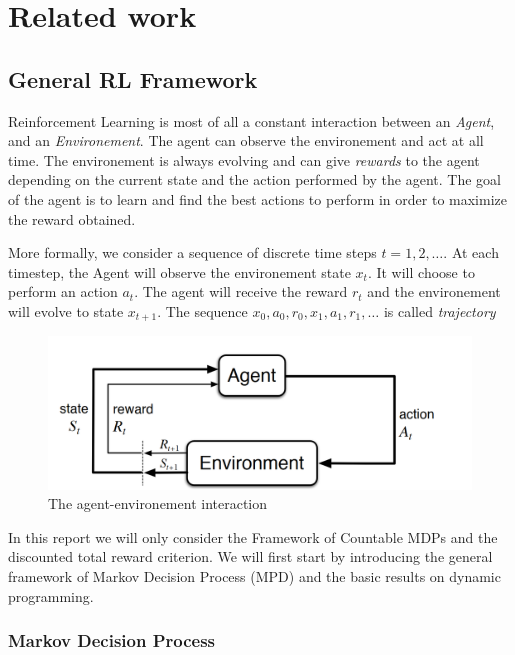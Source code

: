 \section{Related work}

\subsection{General RL Framework}

Reinforcement Learning is most of all a constant interaction between an \emph{Agent}, and an \emph{Environement}. The agent can observe the environement and act at all time. The environement is always evolving and can give \emph{rewards} to the agent depending on the current state and the action performed by the agent. The goal of the agent is to learn and find the best actions to perform in order to maximize the reward obtained.

More formally, we consider a sequence of discrete time steps $t = 1,2,\dots$. At each timestep, the Agent will observe the environement state $x_t$. It will choose to perform an action $a_t$. The agent will receive the reward $r_t$ and the environement will evolve to state $x_{t+1}$. The sequence $x_0, a_0, r_0, x_1, a_1, r_1, \dots$ is called \emph{trajectory}

\begin{figure}[!ht]
    \centering
    \includegraphics[height=0.2\textheight]{figures/personal_work/MDP.png}
    \caption{The agent-environement interaction\cite{sutton2018reinforcement}}
\end{figure}

In this report we will only consider the Framework of Countable MDPs and the discounted total reward criterion.
We will first start by introducing the general framework of Markov Decision Process (MPD) and the basic results on dynamic programming.

\subsubsection*{Markov Decision Process}

